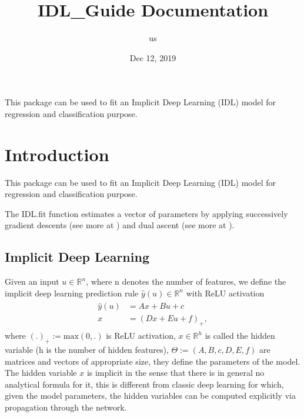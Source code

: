 \documentclass[letterpaper,10pt,english]{sphinxmanual}
\title{IDL\_Guide Documentation}
\date{Dec 12, 2019}
\author{us}
\begin{document}
\pagestyle{empty}
\sphinxmaketitle
\pagestyle{plain}
\sphinxtableofcontents
\pagestyle{normal}
\label{\detokenize{index::doc}}


This package can be used to fit an Implicit Deep Learning (IDL)
model for regression and classification purpose.


\chapter{Introduction}
\label{\detokenize{sections/introduction:introduction}}\label{\detokenize{sections/introduction::doc}}
This package can be used to fit an Implicit Deep Learning (IDL) model for regression
and classification purpose.

The IDL.fit function estimates a vector of parameters by applying successively
gradient descents (see more at {\hyperref[\detokenize{sections/gradient_descents:gradient-descents}]{}}) and dual ascent
(see more at {\hyperref[\detokenize{sections/dual_ascents:dual-ascents}]{}}).


\section{Implicit Deep Learning}
\label{\detokenize{sections/introduction:id1}}
Given an input \(u \in \mathbb{R}^n\), where n denotes the number of features,
we define the implicit deep learning prediction rule \(\hat{y}(u) \in \mathbb{R}^n\) with ReLU activation
\begin{equation}\label{equation:sections/introduction:eq_1}
\begin{split}\begin{align}
    \hat{y}(u) &= Ax + Bu + c \\
    x &= (Dx + Eu + f)_+,
\end{align}\end{split}
\end{equation}
where \((.)_+ := \text{max}(0,.)\) is ReLU activation, \(x \in \mathbb{R}^h\) is called the hidden variable
(h is the number of hidden features), \(\Theta := (A,B,c,D,E,f)\) are matrices and vectors of appropriate size, they define the
parameters of the model. The hidden variable \(x\) is implicit in the sense that there is in general no analytical
formula for it, this is different from classic deep learning for which, given the model parameters, the hidden
variables can be computed explicitly via propagation through the network.
\end{document}
